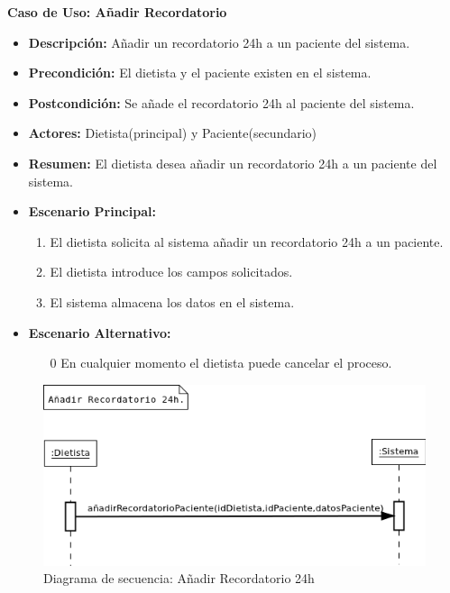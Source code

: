 \textbf{Caso de Uso: Añadir Recordatorio}
\begin{itemize}
\item \textbf{Descripción:} Añadir un recordatorio 24h a un paciente del sistema.
\item \textbf{Precondición:} El dietista y el paciente existen en el sistema.
\item \textbf{Postcondición:} Se añade el recordatorio 24h al paciente del sistema.
\item \textbf{Actores:} Dietista(principal) y Paciente(secundario)
\item \textbf{Resumen:} El dietista desea añadir un recordatorio 24h a un paciente del sistema.
\item \textbf{Escenario Principal:}
\begin{enumerate}
\item El dietista solicita al sistema añadir un recordatorio 24h a un paciente.
\item El dietista introduce los campos solicitados.
\item El sistema almacena los datos en el sistema.
\end{enumerate}
\item \textbf{Escenario Alternativo:}
\begin{enumerate}
\item[0] En cualquier momento el dietista puede cancelar el proceso.
\end{enumerate}
\end{itemize}
\begin{figure}[H]
  \label{ds_anadirrecordatorio}
  \begin{center}
    \includegraphics[scale=0.7]{../img/DS_AnadirRecordatorio.png}
  \end{center}
  \caption{Diagrama de secuencia: Añadir Recordatorio 24h}
\end{figure}
